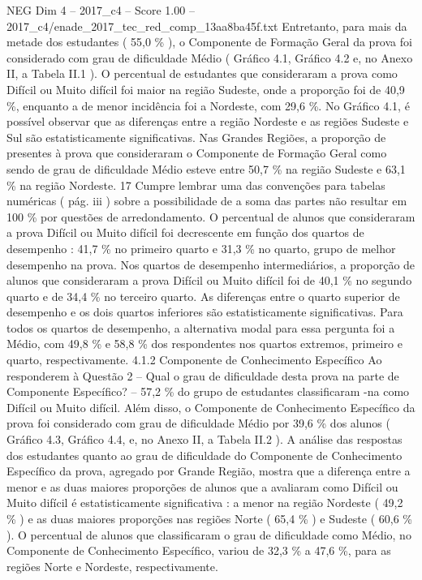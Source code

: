 \begin{textsample}{NEG Dim 4 – 2017\_c4 – Score 1.00 – 2017\_c4/enade\_2017\_tec\_red\_comp\_13aa8ba45f.txt}
Entretanto, para mais da metade dos estudantes ( 55,0 \% ), o Componente de Formação Geral da prova foi considerado com grau de dificuldade Médio ( Gráfico 4.1, Gráfico 4.2 e, no Anexo II, a Tabela II.1 ).
O percentual de estudantes que consideraram a prova como Difícil ou Muito difícil foi maior na região Sudeste, onde a proporção foi de 40,9 \%, enquanto a de menor incidência foi a Nordeste, com 29,6 \%.
No Gráfico 4.1, é possível observar que as diferenças entre a região Nordeste e as regiões Sudeste e Sul são estatisticamente significativas.
Nas Grandes Regiões, a proporção de presentes à prova que consideraram o Componente de Formação Geral como sendo de grau de dificuldade Médio esteve entre 50,7 \% na região Sudeste e 63,1 \% na região Nordeste. 17 Cumpre lembrar uma das convenções para tabelas numéricas ( pág. iii ) sobre a possibilidade de a soma das partes não resultar em 100 \% por questões de arredondamento.
O percentual de alunos que consideraram a prova Difícil ou Muito difícil foi decrescente em função dos quartos de desempenho : 41,7 \% no primeiro quarto e 31,3 \% no quarto, grupo de melhor desempenho na prova.
Nos quartos de desempenho intermediários, a proporção de alunos que consideraram a prova Difícil ou Muito difícil foi de 40,1 \% no segundo quarto e de 34,4 \% no terceiro quarto.
As diferenças entre o quarto superior de desempenho e os dois quartos inferiores são estatisticamente significativas.
Para todos os quartos de desempenho, a alternativa modal para essa pergunta foi a Médio, com 49,8 \% e 58,8 \% dos respondentes nos quartos extremos, primeiro e quarto, respectivamente. 4.1.2 Componente de Conhecimento Específico Ao responderem à Questão 2 – Qual o grau de dificuldade desta prova na parte de Componente Específico? – 57,2 \% do grupo de estudantes classificaram -na como Difícil ou Muito difícil.
Além disso, o Componente de Conhecimento Específico da prova foi considerado com grau de dificuldade Médio por 39,6 \% dos alunos ( Gráfico 4.3, Gráfico 4.4, e, no Anexo II, a Tabela II.2 ).
A análise das respostas dos estudantes quanto ao grau de dificuldade do Componente de Conhecimento Específico da prova, agregado por Grande Região, mostra que a diferença entre a menor e as duas maiores proporções de alunos que a avaliaram como Difícil ou Muito difícil é estatisticamente significativa : a menor na região Nordeste ( 49,2 \% ) e as duas maiores proporções nas regiões Norte ( 65,4 \% ) e Sudeste ( 60,6 \% ).
O percentual de alunos que classificaram o grau de dificuldade como Médio, no Componente de Conhecimento Específico, variou de 32,3 \% a 47,6 \%, para as regiões Norte e Nordeste, respectivamente.

\end{textsample}
